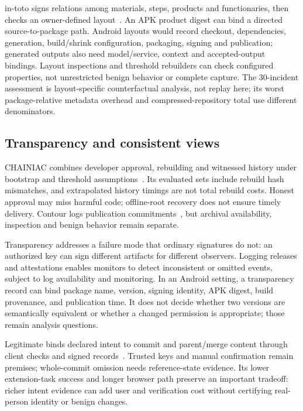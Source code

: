 in-toto signs relations among materials, steps, products and functionaries, then checks an owner-defined layout~\cite{intoto}. An APK product digest can bind a directed source-to-package path. Android layouts would record checkout, dependencies, generation, build/shrink configuration, packaging, signing and publication; generated outputs also need model/service, context and accepted-output bindings. Layout inspections and threshold rebuilders can check configured properties, not unrestricted benign behavior or complete capture. The 30-incident assessment is layout-specific counterfactual analysis, not replay here; its worst package-relative metadata overhead and compressed-repository total use different denominators.

\subsection{Transparency and consistent views}

CHAINIAC combines developer approval, rebuilding and witnessed history under bootstrap and threshold assumptions~\cite{chainiac}. Its evaluated sets include rebuild hash mismatches, and extrapolated history timings are not total rebuild costs. Honest approval may miss harmful code; offline-root recovery does not ensure timely delivery. Contour logs publication commitments~\cite{contour}, but archival availability, inspection and benign behavior remain separate.

Transparency addresses a failure mode that ordinary signatures do not: an authorized key can sign different artifacts for different observers. Logging releases and attestations enables monitors to detect inconsistent or omitted events, subject to log availability and monitoring. In an Android setting, a transparency record can bind package name, version, signing identity, APK digest, build provenance, and publication time. It does not decide whether two versions are semantically equivalent or whether a changed permission is appropriate; those remain analysis questions.

Legitimate binds declared intent to commit and parent/merge content through client checks and signed records~\cite{legitimate}. Trusted keys and manual confirmation remain premises; whole-commit omission needs reference-state evidence. Its lower extension-task success and longer browser path preserve an important tradeoff: richer intent evidence can add user and verification cost without certifying real-person identity or benign changes.

